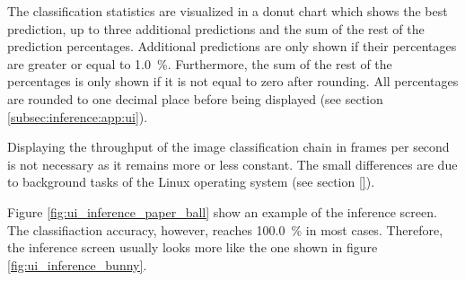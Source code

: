 The classification statistics are visualized in a donut chart which shows the best prediction, up to three additional predictions and the sum of the rest of the prediction percentages.
Additional predictions are only shown if their percentages are greater or equal to \SI{1.0}{\percent}.
Furthermore, the sum of the rest of the percentages is only shown if it is not equal to zero after rounding.
All percentages are rounded to one decimal place before being displayed (see section \ref{subsec:inference:app:ui}).

Displaying the throughput of the image classification chain in frames per second is not necessary as it remains more or less constant.
The small differences are due to background tasks of the Linux operating system (see section \ref{}). %

Figure \ref{fig:ui_inference_paper_ball} show an example of the inference screen.
The classifiaction accuracy, however, reaches \SI{100.0}{\percent} in most cases.
Therefore, the inference screen usually looks more like the one shown in figure \ref{fig:ui_inference_bunny}.


